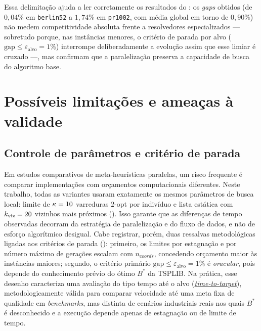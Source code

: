 Essa delimitação ajuda a ler corretamente os resultados do : os \emph{gaps} obtidos (de \(0{,}04\%\) em \texttt{berlin52} a \(1{,}74\%\) em \texttt{pr1002}, com média global em torno de \(0{,}90\%\)) não medem competitividade absoluta frente a resolvedores especializados --- sobretudo porque, nas instâncias menores, o critério de parada por alvo (\(\text{gap} \le \varepsilon_{\text{alvo}} = 1\%\)) interrompe deliberadamente a evolução assim que esse limiar é cruzado ---, mas confirmam que a paralelização preserva a capacidade de busca do algoritmo base.

\section{Possíveis limitações e ameaças à validade}\label{sec-53-ameacas-validade}

\subsection{Controle de parâmetros e critério de parada}\label{sec-531-controle-parametros}

Em estudos comparativos de meta-heurísticas paralelas, um risco frequente é comparar implementações com orçamentos computacionais diferentes.
Neste trabalho, todas as variantes usaram exatamente os mesmos parâmetros de busca local: limite de \(\kappa = 10\) varreduras \(2\)-opt por indivíduo e lista estática com \(k_{\text{viz}} = 20\) vizinhos mais próximos ().
Isso garante que as diferenças de tempo observadas decorram da estratégia de paralelização e do fluxo de dados, e não de esforço algorítmico desigual.
Cabe registrar, porém, duas ressalvas metodológicas ligadas aos critérios de parada (): primeiro, os limites por estagnação e por número máximo de gerações escalam com \(n_{coords}\), concedendo orçamento maior às instâncias maiores; segundo, o critério primário \(\text{gap} \le \varepsilon_{\text{alvo}} = 1\%\) é \emph{oracular}, pois depende do conhecimento prévio do ótimo \(B^*\) da TSPLIB.
Na prática, esse desenho caracteriza uma avaliação do tipo tempo até o alvo (\hyperlink{term:time-to-target}{\emph{time-to-target}}), metodologicamente válida para comparar velocidade até uma meta fixa de qualidade em \emph{benchmarks}, mas distinta de cenários industriais reais nos quais \(B^*\) é desconhecido e a execução depende apenas de estagnação ou de limite de tempo.

